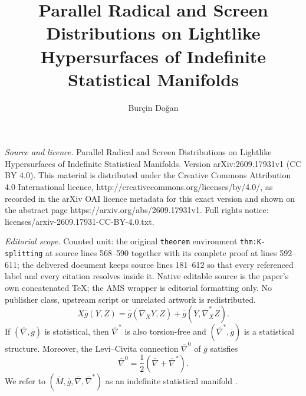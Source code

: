 \documentclass[10pt,a4paper]{amsart}
\begin{document}
\title[Parallel Radical and Screen Distributions on Lightlike Hyper]{Parallel Radical and Screen Distributions on Lightlike Hypersurfaces of Indefinite Statistical Manifolds}
\author{Burçin Doğan}
\date{}
\maketitle
\noindent\emph{Source and licence.} Parallel Radical and Screen Distributions on Lightlike Hypersurfaces of Indefinite Statistical Manifolds. Version arXiv:2609.17931v1 (CC BY 4.0). This material is distributed under the Creative Commons Attribution 4.0 International licence, http://creativecommons.org/licenses/by/4.0/, as recorded in the arXiv OAI licence metadata for this exact version and shown on the abstract page https://arxiv.org/abs/2609.17931v1. Full rights notice: licenses/arxiv-2609.17931-CC-BY-4.0.txt.\par\smallskip
\noindent\textit{Editorial scope.} Counted unit: the original \texttt{theorem} environment \texttt{thm:K-splitting} at source lines 568--590 together with its complete proof at lines 592--611; the delivered document keeps source lines 181--612 so that every referenced label and every citation resolves inside it. Native editable source is the paper's own concatenated TeX; the AMS wrapper is editorial formatting only. No publisher class, upstream script or unrelated artwork is redistributed.
\begin{equation}\label{eq:duality}
X\overline{g}(Y,Z)
=
\overline{g}(\overline{\nabla}_{X}Y,Z)
+
\overline{g}(Y,\overline{\nabla}^{*}_{X}Z).
\end{equation}
If $(\overline{\nabla},\overline{g})$ is statistical, then
$\overline{\nabla}^{*}$ is also torsion-free and
$(\overline{\nabla}^{*},\overline{g})$ is a statistical structure.
Moreover, the Levi--Civita connection $\overline{\nabla}^{0}$ of
$\overline{g}$ satisfies
\begin{equation}\label{eq:levicivita-mean}
\overline{\nabla}^{0}
=
\frac{1}{2}
\left(
\overline{\nabla}
+
\overline{\nabla}^{*}
\right).
\end{equation}
We refer to
$(\overline{M},\overline{g},\overline{\nabla},
\overline{\nabla}^{*})$
as an indefinite statistical manifold
\cite{Amari1985,Lauritzen1987,Vos1989,Furuhata2009}.
\end{document}
